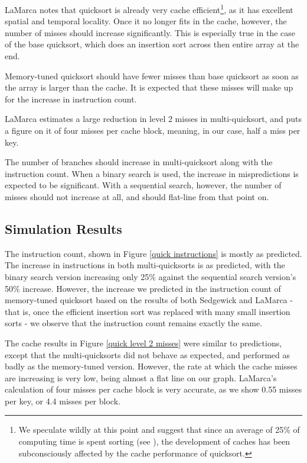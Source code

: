 LaMarca notes that quicksort is already very cache efficient\footnote{We
speculate wildly at this point and suggest that since an average of 25\% of
computing time is spent sorting (see \cite{TODO}), the development of caches has
been subconsciously affected by the cache performance of quicksort.}, as it has
excellent spatial and temporal locality. Once it no longer fits in the cache,
however, the number of misses should increase significantly. This is especially
true in the case of the base quicksort, which does an insertion sort across then
entire array at the end.

Memory-tuned quicksort should have fewer misses than base quicksort as soon as
the array is larger than the cache. It is expected that these misses will make
up for the increase in instruction count.

LaMarca estimates a large reduction in level 2 misses in multi-quicksort, and
puts a figure on it of four misses per cache block, meaning, in our case, half a
miss per key.

The number of branches should increase in multi-quicksort along with the
instruction count. When a binary search is used, the increase in mispredictions
is expected to be significant. With a sequential search, however, the number of
misses should not increase at all, and should flat-line from that point on.

\subsection{Simulation Results}


The instruction count, shown in Figure \ref{quick instructions} is mostly as
predicted. The increase in instructions in both multi-quicksorts is as
predicted, with the binary search version increasing only 25\% against the
sequential search version's 50\% increase. However, the increase we predicted in
the instruction count of memory-tuned quicksort based on the results of both
Sedgewick and LaMarca - that is, once the efficient insertion sort was replaced
with many small insertion sorts - we observe that the instruction count remains
exactly the same.

The cache results in Figure \ref{quick level 2 misses} were similar to
predictions, except that the multi-quicksorts did not behave as expected, and
performed as badly as the memory-tuned version. However, the rate at which the
cache misses are increasing is very low, being almost a flat line on our graph.
LaMarca's calculation of four misses per cache block is very accurate, as we
show 0.55 misses per key, or 4.4 misses per block.

